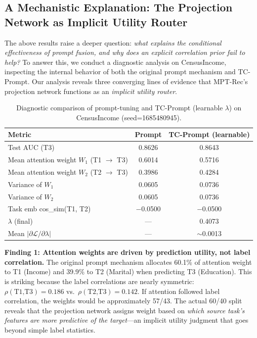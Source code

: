 \documentclass[review,anonymous]{acmart}
\begin{document}
\subsection{A Mechanistic Explanation: The Projection Network as Implicit Utility Router}
\label{sec:tc_prompt_diagnosis}

The above results raise a deeper question: \emph{what explains the conditional
effectiveness of prompt fusion, and why does an explicit correlation prior fail
to help?} To answer this, we conduct a diagnostic analysis on CensusIncome,
inspecting the internal behavior of both the original prompt mechanism and
TC-Prompt. Our analysis reveals three converging lines of evidence that MPT-Rec's
projection network functions as an \emph{implicit utility router}.

\begin{table}[t]
  \centering
  \caption{Diagnostic comparison of prompt-tuning and TC-Prompt (learnable
           $\lambda$) on CensusIncome (seed=1685480945).}
  \label{tab:diagnostic}
  \begin{tabular}{lcc}
    \toprule
    \textbf{Metric} & \textbf{Prompt} & \textbf{TC-Prompt (learnable)} \\
    \midrule
    Test AUC (T3)                & 0.8626 & 0.8643 \\
    Mean attention weight $W_1$ (T1 $\rightarrow$ T3) & 0.6014 & 0.5716 \\
    Mean attention weight $W_2$ (T2 $\rightarrow$ T3) & 0.3986 & 0.4284 \\
    Variance of $W_1$            & 0.0605 & 0.0736 \\
    Variance of $W_2$            & 0.0605 & 0.0736 \\
    Task emb cos\_sim(T1, T2)    & $-$0.0500 & $-$0.0500 \\
    $\lambda$ (final)            & --- & 0.4073 \\
    Mean $|\partial\mathcal{L}/\partial\lambda|$ & --- & $\sim$0.0013 \\
    \bottomrule
  \end{tabular}
\end{table}

\textbf{Finding 1: Attention weights are driven by prediction utility, not label correlation.}
The original prompt mechanism allocates 60.1\% of attention weight to T1 (Income)
and 39.9\% to T2 (Marital) when predicting T3 (Education). This is striking
because the label correlations are nearly symmetric: $\rho(\text{T1,T3}) = 0.186$
vs.\ $\rho(\text{T2,T3}) = 0.142$. If attention followed label correlation, the
weights would be approximately 57/43. The actual 60/40 split reveals that the
projection network assigns weight based on \emph{which source task's features are
more predictive of the target}---an implicit utility judgment that goes beyond
simple label statistics.
\end{document}
